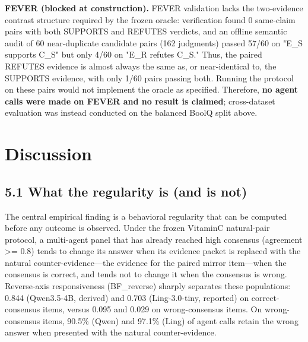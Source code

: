 \documentclass[11pt]{article}
\begin{document}
\textbf{FEVER (blocked at construction).} FEVER validation lacks the two-evidence contrast structure required by the frozen oracle: verification found 0 same-claim pairs with both SUPPORTS and REFUTES verdicts, and an offline semantic audit of 60 near-duplicate candidate pairs (162 judgments) passed 57/60 on "E\_S supports C\_S" but only 4/60 on "E\_R refutes C\_S." Thus, the paired REFUTES evidence is almost always the same as, or near-identical to, the SUPPORTS evidence, with only 1/60 pairs passing both. Running the protocol on these pairs would not implement the oracle as specified. Therefore, \textbf{no agent calls were made on FEVER and no result is claimed}; cross-dataset evaluation was instead conducted on the balanced BoolQ split above.


\section{Discussion}

\subsection{5.1 What the regularity is (and is not)}

The central empirical finding is a behavioral regularity that can be computed before any outcome is observed. Under the frozen VitaminC natural-pair protocol, a multi-agent panel that has already reached high consensus (agreement >= 0.8) tends to change its answer when its evidence packet is replaced with the natural counter-evidence—the evidence for the paired mirror item—when the consensus is correct, and tends not to change it when the consensus is wrong. Reverse-axis responsiveness (BF\_reverse) sharply separates these populations: 0.844 (Qwen3.5-4B, derived) and 0.703 (Ling-3.0-tiny, reported) on correct-consensus items, versus 0.095 and 0.029 on wrong-consensus items. On wrong-consensus items, 90.5\% (Qwen) and 97.1\% (Ling) of agent calls retain the wrong answer when presented with the natural counter-evidence.
\end{document}
